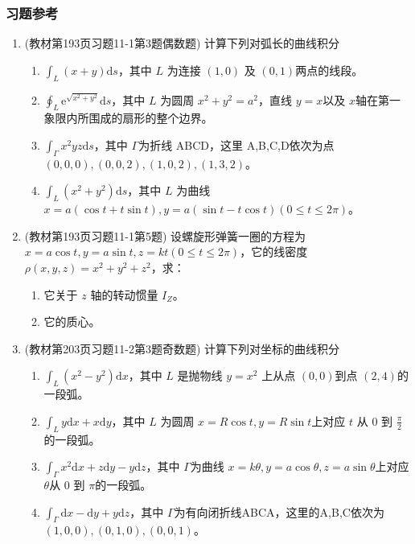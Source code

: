 \subsubsection{习题参考}
\begin{enumerate}
\item (教材第193页习题11-1第3题偶数题) 计算下列对弧长的曲线积分
    \begin{enumerate}[(1)]
        \item $\int _L (x+y) \mathrm{d} s$，其中 $L$ 为连接 $(1,0)$ 及 $(0,1)$两点的线段。
        \item $\oint _L \mathrm{e}^{\sqrt{x^2 + y^2}} \mathrm{d}s$，其中 $L$ 为圆周 $x^2+y^2 =a^2$，直线 $y=x$以及 $x$轴在第一象限内所围成的扇形的整个边界。
        \item $\int _\Gamma x^2 yz \mathrm{d}s$，其中 $\Gamma$为折线 ABCD，这里 A,B,C,D依次为点 $(0,0,0),(0,0,2),(1,0,2),(1,3,2)$。
        \item $\int _L (x^2 + y^2 ) \mathrm{d}s$，其中 $L$ 为曲线 $x=a(\cos t + t\sin t), y = a(\sin t - t \cos t) (0 \le t \le 2 \pi)$。
    \end{enumerate}

\item (教材第193页习题11-1第5题) 设螺旋形弹簧一圈的方程为 $x=a \cos t, y= a\sin t, z=kt(0 \le t \le 2\pi)$，它的线密度 $\rho(x,y,z) = x^2+y^2+z^2$，求：
    \begin{enumerate}[(1)]
        \item 它关于 $z$ 轴的转动惯量 $I_Z$。
        \item 它的质心。
    \end{enumerate}

\item (教材第203页习题11-2第3题奇数题) 计算下列对坐标的曲线积分
    \begin{enumerate}[(1)]
        \item $\int _L (x^2 - y^2) \mathrm{d}x$，其中 $L$ 是抛物线 $y=x^2$ 上从点 $(0,0)$到点 $(2,4)$的一段弧。
        
        \item $\int _L y \mathrm{d} x + x \mathrm{d}y$，其中 $L$ 为圆周 $x = R \cos t, y = R \sin t$上对应 $t$ 从 0 到 $\frac{\pi}{2}$的一段弧。
        
        \item $\int _\Gamma x^2 \mathrm{d}x + z \mathrm{d}y -y \mathrm{d}z $，其中 $\Gamma$为曲线 $x = k \theta, y= a \cos \theta, z = a \sin \theta$上对应 $\theta$从 0 到 $\pi$的一段弧。

        \item $\int _\Gamma \mathrm{d} x - \mathrm{d}y + y \mathrm{d}z $，其中 $\Gamma$为有向闭折线ABCA，这里的A,B,C依次为 $(1,0,0),(0,1,0),(0,0,1)$。
    \end{enumerate}


\end{enumerate}
